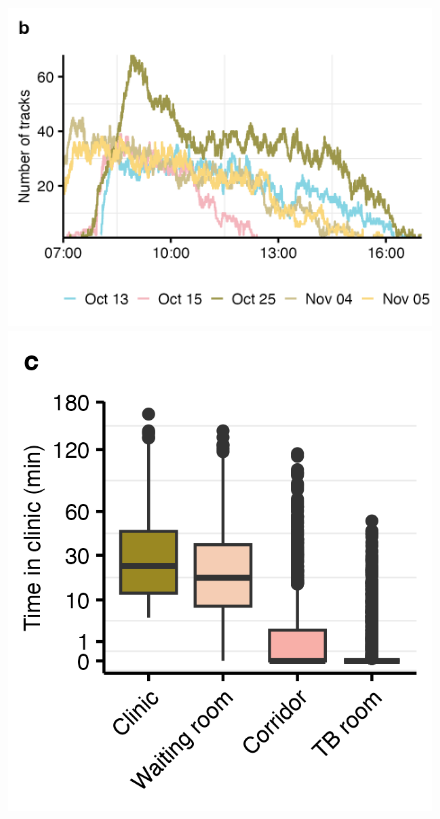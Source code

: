 \documentclass[fleqn,11pt]{wlscirep}
\begin{document}
\begin{figure}
    \includegraphics{results/data/no-people-over-time.png}
    \includegraphics{results/data/time-in-clinic.png}

\end{figure}
\end{document}
